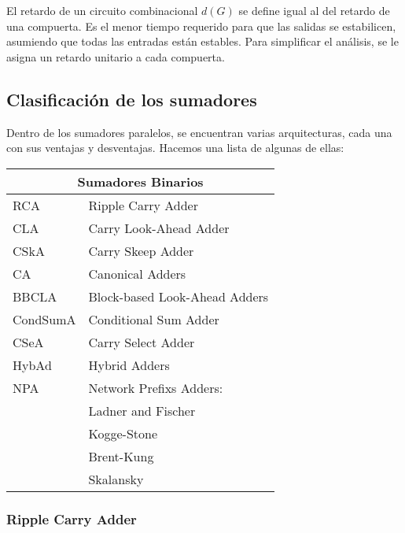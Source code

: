 El retardo de un circuito combinacional \(d(G)\) se define igual al del retardo de una compuerta. Es el menor tiempo requerido para que las salidas se estabilicen, asumiendo que todas las entradas están estables. Para simplificar el análisis, se le asigna un retardo unitario a cada compuerta.



\subsection{Clasificación de los sumadores}

Dentro de los sumadores paralelos, se encuentran varias arquitecturas, cada una con sus ventajas y desventajas. Hacemos una lista de algunas de ellas:

\vspace{0.3cm}

\begin{tabular}{ |l|l| }
  \hline
  \multicolumn{2}{|c|}{Sumadores Binarios} \\
  \hline

RCA & Ripple Carry Adder \\
CLA & Carry Look-Ahead Adder \\
CSkA & Carry Skeep Adder \\
CA & Canonical Adders \\
BBCLA & Block-based Look-Ahead Adders \\
CondSumA & Conditional Sum Adder \\
CSeA & Carry Select Adder \\
HybAd & Hybrid Adders \\
NPA & Network Prefixs Adders: \\
& Ladner and Fischer \\
&Kogge-Stone \\
&Brent-Kung \\
&Skalansky \\
  \hline
\end{tabular}
\vspace{0.3cm}


\subsubsection{Ripple Carry Adder}


